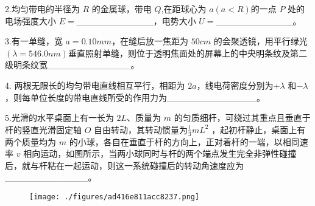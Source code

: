 2.均匀带电的半径为 $R$ 的金属球，带电 $Q$,在距球心为 $a(a<R)$的一点 $P$ 处的电场强度大小 $E=$____________，电势大小 $U=$____________。

3.有一单缝，宽 $a=0.10mm$，在缝后放一焦距为 $50cm$ 的会聚透镜，用平行绿光$(\lambda=546.0nm)$垂直照射单缝，则位于透明焦面处的屏幕上的中央明条纹及第二级明条纹宽_____________。

4. 两根无限长的均匀带电直线相互平行，相距为 $2a$，线电荷密度分别为$+\lambda$ 和$-\lambda$ ，则每单位长度的带电直线所受的作用力为______________。

5.光滑的水平桌面上有一长为 $2L$、质量为 $m$ 的匀质细杆，可绕过其重点且垂直于杆的竖直光滑固定轴 $O$ 自由转动，其转动惯量为$\frac{1}{3}mL^2$ ，起初杆静止，桌面上有两个质量均为 $m$ 的小球，各自在垂直于杆的方向上，正对着杆的一端，以相同速率 $v$ 相向运动，如图所示，当两小球同时与杆的两个端点发生完全非弹性碰撞后，就与杆粘在一起运动，则这一系统碰撞后的转动角速度应为 _____________。
\begin{figure}[ht]
\centering
\texttt{[image: ./figures/ad416e811acc8237.png]}
\caption{} \label{fig_NJUD5_3}
\end{figure}
